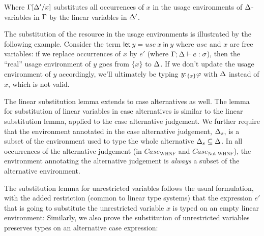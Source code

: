 \documentclass[acmsmall, screen, review]{acmart}
\newcommand{\llet}[2]{\mathsf{let}~#1~\mathsf{in}~#2}
\begin{document}
\LinearSubstitutionLemma

\noindent Where $\Gamma[\Delta'/x]$ substitutes all occurrences of $x$ in the usage
environments of $\Delta$-variables in $\Gamma$ by the linear variables in $\Delta'$.

The substitution of the resource in the usage environments is illustrated
by the following example. Consider the term $\llet{y = use~x}{y}$ where $use$ and $x$ are free variables:
if we replace occurrences of $x$ by $e'$ (where $\Gamma;\Delta \vdash e : \sigma$), then the
``real'' usage environment of $y$ goes from $\{x\}$ to $\Delta$. If we don't update
the usage environment of $y$ accordingly, we'll ultimately be typing
$y{:}_{\{x\}}\varphi$ with $\Delta$ instead of $x$, which is not valid.

The linear substitution lemma extends to case alternatives as well.
The lemma for substitution of linear variables in case alternatives is similar
to the linear substitution lemma, applied to the case alternative judgement.
%
\LinearSubstitutionAltsLemma
%
\noindent We further require that the environment annotated in the case
alternative judgement, $\Delta_s$, is a subset of the environment used to type the
whole alternative $\Delta_s \subseteq \Delta$. In all occurrences of the alternative
judgement (in $Case_{\textrm{WHNF}}$ and $Case_{\textrm{Not WHNF}}$), the
environment annotating the alternative judgement is \emph{always} a subset of
the alternative environment.

The substitution lemma for unrestricted variables follows the usual
formulation, with the added restriction (common to linear type systems) that
the expression $e'$ that is going to substitute the unrestricted variable $x$
is typed on an empty linear environment:
%
\UnrestrictedSubstitutionLemma
%
\noindent Similarly, we also prove the substitution of unrestricted variables preserves types on an alternative case expression:
%
\UnrestrictedSubstitutionAltsLemma
\end{document}
